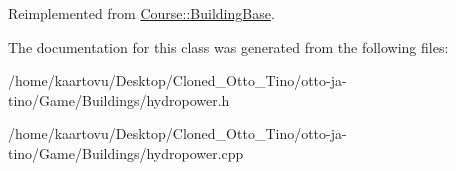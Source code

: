 Reimplemented from \hyperlink{class_course_1_1_building_base_ac2cc44e08dc73d05b1617bf71295baaf}{Course\-::\-Building\-Base}.



The documentation for this class was generated from the following files\-:\begin{DoxyCompactItemize}
\item 
/home/kaartovu/\-Desktop/\-Cloned\-\_\-\-Otto\-\_\-\-Tino/otto-\/ja-\/tino/\-Game/\-Buildings/hydropower.\-h\item 
/home/kaartovu/\-Desktop/\-Cloned\-\_\-\-Otto\-\_\-\-Tino/otto-\/ja-\/tino/\-Game/\-Buildings/hydropower.\-cpp\end{DoxyCompactItemize}

